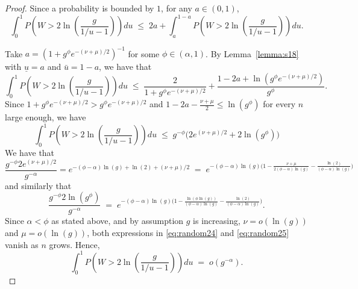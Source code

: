 \documentclass[bj,authoryear]{imsart}
\theoremstyle{plain}
\begin{document}
\begin{proof}
Since a probability is bounded by $1$, for any $a\in(0,1)$,
\begin{equation}\label{eq:basebound}
    \int_0^1 P\left(W>2 \ln \left(\frac{g}{1 / u-1}\right)\right) d u \;\leq\; 2 a+\int_{a}^{1-a} P\left(W>2\ln\left(\frac{g}{1 / u-1}\right)\right) d u.
\end{equation}

Take $a=\left(1+g^{\phi}e^{-(\nu+\mu)/ 2}\right)^{-1}$ for some $\phi\in(\alpha,1)$. By Lemma~\ref{lemma:s18} with $\underline{u}=a$ and $\bar{u}=1-a$, we have that
$$
\int_0^1 P\left(W>2 \ln \left(\frac{g}{1 / u-1}\right)\right) d u \;\leq\; \frac{2}{1+g^{\phi}e^{-(\nu+\mu)/2}}+ 
\frac{1-2a+\ln(g^{\phi}e^{-(\nu+\mu)/2})}{g^{\phi}}. $$
Since $1+g^{\phi}e^{-(\nu+\mu)/ 2}>g^{\phi}e^{-(\nu+\mu)/ 2}$ and $1-2a-\frac{\nu+\mu}{2}\leq \ln(g^\phi)$ for every $n$ large enough, we have
$$
\int_0^1 P\left(W>2 \ln \left(\frac{g}{1 / u-1}\right)\right) d u \;\leq\; g^{-\phi}\big(2e^{(\nu+\mu)/ 2}+2\ln(g^{\phi})\big) $$
We have that
\begin{equation}\label{eq:random24}
    \frac{g^{-\phi}2e^{(\nu+\mu)/ 2}}{g^{-\alpha}} 
= e^{-(\phi-\alpha) \ln(g) + \ln(2) + (\nu + \mu)/2}
    \;=\;e^{-(\phi-\alpha)\ln(g)\big(1-\frac{\nu+\mu}{2(\phi-\alpha)\ln(g)}- \frac{\ln(2)}{(\phi-\alpha)\ln(g)}\big)}
\end{equation}
and similarly that
\begin{equation}\label{eq:random25}
    \frac{g^{-\phi}2\ln(g^{\phi})}{g^{-\alpha}} \;=\;e^{-(\phi-\alpha)\ln(g)\big(1-\frac{\ln(\phi\ln(g))}{(\phi-\alpha)\ln(g)}- \frac{\ln(2)}{(\phi-\alpha)\ln(g)}\big)}.
\end{equation}
Since $\alpha<\phi$ as stated above, and by assumption $g$ is increasing, $\nu=o(\ln(g))$ and $\mu=o(\ln(g))$, both expressions in \eqref{eq:random24} and \eqref{eq:random25} vanish as $n$ grows. Hence, 
$$\int_0^1 P\left(W>2 \ln \left(\frac{g}{1 / u-1}\right)\right) d u \;=\; o(g^{-\alpha}).$$
\end{proof}
\end{document}
